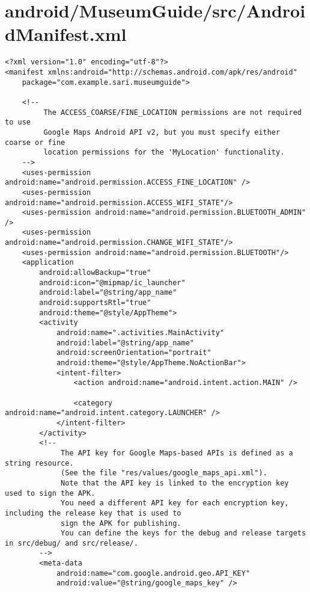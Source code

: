 \section{android/MuseumGuide/src/AndroidManifest.xml}
\begin{lstlisting}<?xml version="1.0" encoding="utf-8"?>
<manifest xmlns:android="http://schemas.android.com/apk/res/android"
    package="com.example.sari.museumguide">

    <!--
         The ACCESS_COARSE/FINE_LOCATION permissions are not required to use
         Google Maps Android API v2, but you must specify either coarse or fine
         location permissions for the 'MyLocation' functionality. 
    -->
    <uses-permission android:name="android.permission.ACCESS_FINE_LOCATION" />
    <uses-permission android:name="android.permission.ACCESS_WIFI_STATE"/>
    <uses-permission android:name="android.permission.BLUETOOTH_ADMIN" />
    <uses-permission android:name="android.permission.CHANGE_WIFI_STATE"/>
    <uses-permission android:name="android.permission.BLUETOOTH"/>
    <application
        android:allowBackup="true"
        android:icon="@mipmap/ic_launcher"
        android:label="@string/app_name"
        android:supportsRtl="true"
        android:theme="@style/AppTheme">
        <activity
            android:name=".activities.MainActivity"
            android:label="@string/app_name"
            android:screenOrientation="portrait"
            android:theme="@style/AppTheme.NoActionBar">
            <intent-filter>
                <action android:name="android.intent.action.MAIN" />

                <category android:name="android.intent.category.LAUNCHER" />
            </intent-filter>
        </activity>
        <!--
             The API key for Google Maps-based APIs is defined as a string resource.
             (See the file "res/values/google_maps_api.xml").
             Note that the API key is linked to the encryption key used to sign the APK.
             You need a different API key for each encryption key, including the release key that is used to
             sign the APK for publishing.
             You can define the keys for the debug and release targets in src/debug/ and src/release/. 
        -->
        <meta-data
            android:name="com.google.android.geo.API_KEY"
            android:value="@string/google_maps_key" />


\end{lstlisting}
